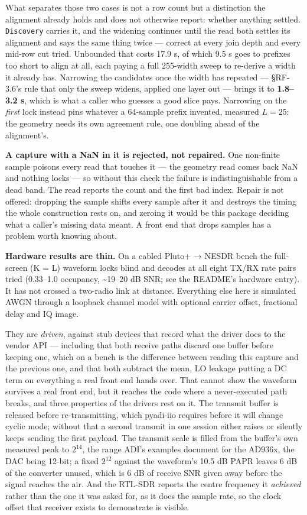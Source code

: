\documentclass[10pt,letterpaper,twocolumn]{article}
\begin{document}
What separates those two cases is not a row count but a distinction the alignment already holds and does not otherwise report: whether anything settled. \texttt{Discovery} carries it, and the widening continues until the read both settles its alignment and says the same thing twice --- correct at every join depth and every mid-row cut tried. Unbounded that costs 17.9 s, of which 9.5 s goes to prefixes too short to align at all, each paying a full 255-width sweep to re-derive a width it already has. Narrowing the candidates once the width has repeated --- §RF-3.6's rule that only the sweep widens, applied one layer out --- brings it to \textbf{1.8--3.2 s}, which is what a caller who guesses a good slice pays. Narrowing on the \emph{first} lock instead pins whatever a 64-sample prefix invented, measured \(L=25\): the geometry needs its own agreement rule, one doubling ahead of the alignment's.

\textbf{A capture with a NaN in it is rejected, not repaired.} One non-finite sample poisons every read that touches it --- the geometry read comes back NaN and nothing locks --- so without this check the failure is indistinguishable from a dead band. The read reports the count and the first bad index. Repair is not offered: dropping the sample shifts every sample after it and destroys the timing the whole construction rests on, and zeroing it would be this package deciding what a caller's missing data meant. A front end that drops samples has a problem worth knowing about.

\textbf{Hardware results are thin.} On a cabled Pluto+ → NESDR bench the full-screen (K = L) waveform locks blind and decodes at all eight TX/RX rate pairs tried (0.33--1.0 occupancy, \textasciitilde19--20 dB SNR; see the README's hardware entry). It has not crossed a two-radio link at distance. Everything else here is simulated AWGN through a loopback channel model with optional carrier offset, fractional delay and IQ image.

They are \emph{driven}, against stub devices that record what the driver does to the vendor API --- including that both receive paths discard one buffer before keeping one, which on a bench is the difference between reading this capture and the previous one, and that both subtract the mean, LO leakage putting a DC term on everything a real front end hands over. That cannot show the waveform survives a real front end, but it reaches the code where a never-executed path breaks, and three properties of the drivers rest on it. The transmit buffer is released before re-transmitting, which pyadi-iio requires before it will change cyclic mode; without that a second transmit in one session either raises or silently keeps sending the first payload. The transmit scale is filled from the buffer's own measured peak to \(2^{14}\), the range ADI's examples document for the AD936x, the DAC being 12-bit; a fixed \(2^{12}\) against the waveform's 10.5 dB PAPR leaves 6 dB of the converter unused, which is 6 dB of receive SNR given away before the signal reaches the air. And the RTL-SDR reports the centre frequency it \emph{achieved} rather than the one it was asked for, as it does the sample rate, so the clock offset that receiver exists to demonstrate is visible.
\end{document}
